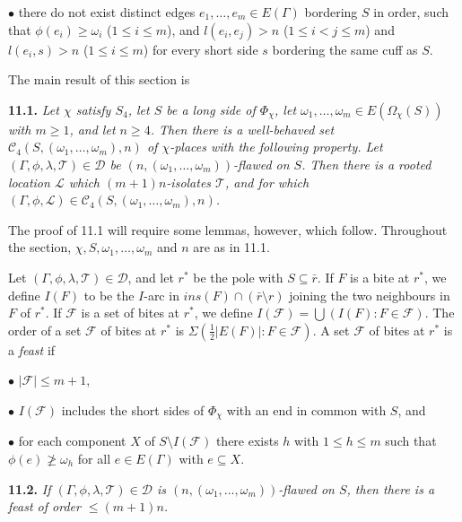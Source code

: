 \hspace*{12pt}$\bullet$ there do not exist distinct edges $e_1, \dots, e_m \in E(\Gamma)$ bordering $S$ in order, such that $\phi(e_i) \ge \omega_i$ ($1 \le i \le m$), and $l(e_i, e_j) > n$ ($1 \le i < j \le m$) and $l(e_i, s) > n$ ($1 \le i \le m$) for every short side $s$ bordering the same cuff as $S$.

The main result of this section is

\textbf{11.1.} \textit{Let $\chi$ satisfy $S_4$, let $S$ be a long side of $\Phi_\chi$, let $\omega_1, \dots, \omega_m \in E(\Omega_\chi(S))$ with $m \ge 1$, and let $n \ge 4$. Then there is a well-behaved set $\mathscr{C}_4(S, (\omega_1, \dots, \omega_m), n)$ of $\chi$-places with the following property. Let $(\Gamma, \phi, \lambda, \mathscr{T}) \in \mathscr{D}$ be $(n, (\omega_1, \dots, \omega_m))$-flawed on $S$. Then there is a rooted location $\mathscr{L}$ which $(m + 1)n$-isolates $\mathscr{T}$, and for which $(\Gamma, \phi, \mathscr{L}) \in \mathscr{C}_4(S, (\omega_1, \dots, \omega_m), n)$.}

The proof of 11.1 will require some lemmas, however, which follow. Throughout the section, $\chi, S, \omega_1, \dots, \omega_m$ and $n$ are as in 11.1.

Let $(\Gamma, \phi, \lambda, \mathscr{T}) \in \mathscr{D}$, and let $r^*$ be the pole with $S \subseteq \bar{r}$. If $F$ is a bite at $r^*$, we define $I(F)$ to be the $I$-arc in $ins(F) \cap (\bar{r} \setminus r)$ joining the two neighbours in $F$ of $r^*$. If $\mathscr{F}$ is a set of bites at $r^*$, we define $I(\mathscr{F}) = \bigcup(I(F) : F \in \mathscr{F})$. The order of a set $\mathscr{F}$ of bites at $r^*$ is $\Sigma(\frac{1}{2}|E(F)| : F \in \mathscr{F})$. A set $\mathscr{F}$ of bites at $r^*$ is a \textit{feast} if

\hspace*{12pt}$\bullet$ $|\mathscr{F}| \le m + 1$,

\hspace*{12pt}$\bullet$ $I(\mathscr{F})$ includes the short sides of $\Phi_\chi$ with an end in common with $S$, and

\hspace*{12pt}$\bullet$ for each component $X$ of $S \setminus I(\mathscr{F})$ there exists $h$ with $1 \le h \le m$ such that $\phi(e) \not\ge \omega_h$ for all $e \in E(\Gamma)$ with $e \subseteq X$.

\textbf{11.2.} \textit{If $(\Gamma, \phi, \lambda, \mathscr{T}) \in \mathscr{D}$ is $(n, (\omega_1, \dots, \omega_m))$-flawed on $S$, then there is a feast of order $\le (m + 1)n$.}

